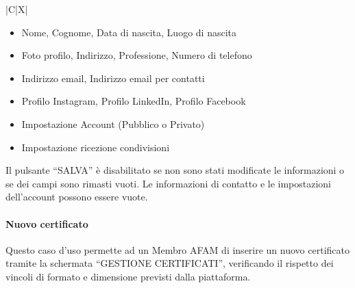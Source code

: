 \begin{tabularx}{\textwidth}{|C|X|}
{\begin{itemize}
    \item Nome, Cognome, Data di nascita, Luogo di nascita
    \item Foto profilo, Indirizzo, Professione, Numero di telefono
    \item Indirizzo email, Indirizzo email per contatti
    \item Profilo Instagram, Profilo LinkedIn, Profilo Facebook
    \item Impostazione Account (Pubblico o Privato)
    \item Impostazione ricezione condivisioni
\end{itemize}
Il pulsante ``SALVA'' è disabilitato se non sono stati modificate le informazioni o se dei campi sono rimasti vuoti. \newline
Le informazioni di contatto e le impostazioni dell'account possono essere vuote.}
\hline
\end{tabularx}

\clearpage

\paragraph{Nuovo certificato}
\par{\noindent Questo caso d'uso permette ad un Membro AFAM di inserire un nuovo certificato tramite la schermata ``GESTIONE CERTIFICATI'', verificando il rispetto dei vincoli di formato e dimensione previsti dalla piattaforma.}

